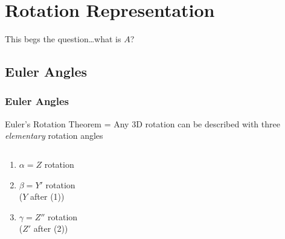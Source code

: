 \documentclass[11pt]{beamer}
\begin{document}
    \section{Rotation Representation}\label{sec:rotationRepresentation}
    \begin{frame}
        \begin{center}
            \LARGE{This begs the question\ldots what is $A$?}
        \end{center}
    \end{frame}

    \subsection{Euler Angles}\label{subsec:eulerAngles}
    \begin{frame}
        \frametitle{Euler Angles}
        \begin{definition}
            Euler's Rotation Theorem = Any 3D rotation can be described with three \textit{elementary} rotation angles
        \end{definition}
        \begin{columns}
            \begin{column}{0.5\textwidth}
                \begin{enumerate}
                    \item $\alpha = Z$ rotation \bigskip
                    \item $\beta = Y'$ rotation \\ ($Y$ after (1)) \bigskip
                    \item $\gamma = Z''$ rotation \\ ($Z'$ after (2)) \bigskip
                \end{enumerate}
            \end{column}
            \begin{column}{0.55\textwidth}

\end{column}
\end{columns}
\end{frame}
\end{document}
